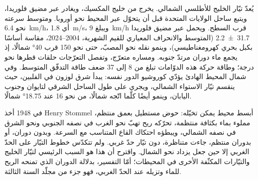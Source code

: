 يُعدّ تيّار الخليج  للأطلسي الشمالي. يخرج من خليج المكسيك، ويغادر عبر مضيق فلوريدا، ويتبع ساحل الولايات المتحدة قبل أن يتحوّل عبر المحيط نحو أوروبا. ومتوسط سرعته نحو \qty{6.4}{km/h}، أي \qty{1.8}{m/s}، ويبلغ \qty{9}{km/h} قرب السطح. ويحمل عبر مضيق فلوريدا \qty[uncertainty-mode=separate]{31.7 \pm 2.2}{\sverdrup} (المتوسط والانحراف المعياري للقيم الشهرية، 2004--2024، مقاسة أساسًا بكبل بحري كهرومغناطيسي)، وينمو نقله نحو المصبّ، حتى نحو \qty{150}{\sverdrup} قرب \ang{40} شمالًا، إذ يجمع ماء دوران مرتدّ جنوبه. ومساره متعرّج، وتفصل التعرّجات حلقات قطرها نحو درجة؛ وطاقة حركة هذه الدوّامات تبلغ من 8 إلى 37 ضعف طاقة التدفّق المتوسط. وفي شمال المحيط الهادئ يؤدّي كوروشيو الدور نفسه: يبدأ شرق لوزون في الفلبين، حيث ينقسم تيّار الاستواء الشمالي، ويجري على طول الساحل الشرقي لتايوان وجنوب اليابان، وينمو أيضًا كلّما اتّجه شمالًا، من نحو \qty{16}{\sverdrup} عند \ang{18.75} شمالًا.

\begin{history}[ستوميل 1948]
في 1948 أخذ Henry Stommel أبسط محيط يمكن تخيّله: حوض مستطيل بعمق منتظم، مملوء بماء بكثافة منتظمة، تحرّكه ريح تهبّ نحو الغرب في نصفه الجنوبي ونحو الشرق في نصفه الشمالي، ويبطؤه احتكاك القاع المتناسب مع السرعة. وبدون دوران، أو بدوران منتظم، جاءت  متناظرة، دون تيّار حدّ غربي. ولم تتكدّس خطوط التيّار على الحدّ الغربي إلا حين جعل  يزداد نحو الشمال. واقترح أن هذا هو السبب الرئيسي لتيّار الخليج والتيّارات المكثّفة الأخرى في المحيطات؛ أمّا التفسير، بدلالة الدوران الذي تمنحه الريح للماء وتزيله عند الحدّ الغربي، فهو جزء من مجلّد السنة الثالثة.
\end{history}

